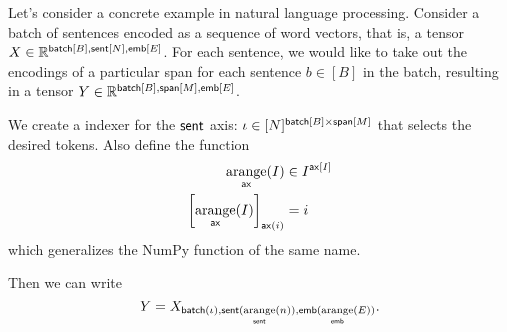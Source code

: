 Let's consider a concrete example in natural language processing. Consider a batch of sentences encoded as a sequence of word vectors, that is, a tensor $X \in \mathbb{R}^{\nset{batch}{B}, \nset{sent}{N}, \nset{emb}{E}}$. For each sentence, we would like to take out the encodings of a particular span for each sentence $b \in [B]$ in the batch, resulting in a tensor $Y \in \mathbb{R}^{\nset{batch}{B}, \nset{span}{M}, \nset{emb}{E}}$.

We create a indexer for the $\name{sent}$ axis: $\iota \in [N]^{\nset{batch}{B} \times \nset{span}{M}}$ that selects the desired tokens. Also define the function
\begin{align*}
  \nfun{ax}{arange}(I) &\in I^{\nset{ax}{I}} \\
  \left[\nfun{ax}{arange}(I)\right]_{\nidx{ax}{i}} &= i
\end{align*}
which generalizes the NumPy function of the same name.

Then we can write
\begin{equation*}
  Y = X_{\nidx{batch}{\iota}, \nidx{sent}{\nfun{sent}{arange}(n)}, \nidx{emb}{\nfun{emb}{arange}(E)}}.
\end{equation*}
